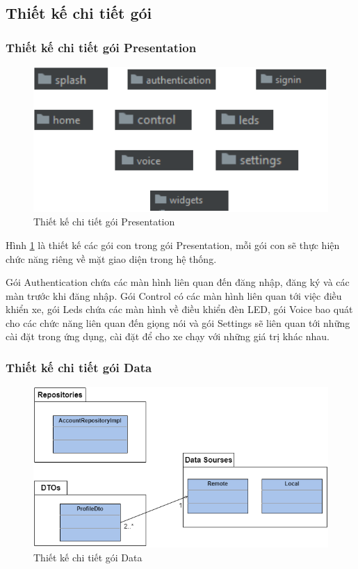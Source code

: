 \documentclass[../DoAn.tex]{subfiles}
\begin{document}
\subsection{Thiết kế chi tiết gói}

\subsubsection{Thiết kế chi tiết gói Presentation}

\begin{figure}[H]
    \centering
    \includegraphics[scale = 0.6]{Hinhve/package_presentation.png}
    \caption{Thiết kế chi tiết gói Presentation}
    \label{fig:0.1.3.1}
\end{figure}

Hình \ref{fig:0.1.3.1} là thiết kế các gói con trong gói Presentation, mỗi gói con sẽ thực hiện chức năng riêng về mặt giao diện trong hệ thống. 

Gói Authentication chứa các màn hình liên quan đến đăng nhập, đăng ký và các màn trước khi đăng nhập. Gói Control có các màn hình liên quan tới việc điều khiển xe, gói Leds chứa các màn hình về điều khiển đèn LED, gói Voice bao quát cho các chức năng liên quan đến giọng nói và gói Settings sẽ liên quan tới những cài đặt trong ứng dụng, cài đặt để cho xe chạy với những giá trị khác nhau.

\subsubsection{Thiết kế chi tiết gói Data}

\begin{figure}[H]
    \centering
    \includegraphics[scale = 0.6]{Hinhve/package_data.png}
    \caption{Thiết kế chi tiết gói Data}
    \label{fig:0.1.3.2}
\end{figure}
\end{document}
